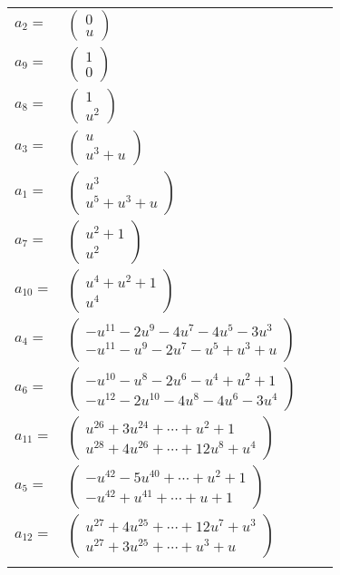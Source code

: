 \documentclass[1p]{elsarticle_modified}
\theoremstyle{definition}
\begin{document}
\begin{tabular}{m{7pt} m{180pt} m{7pt} m{180pt} }
\flushright $a_{2}=$&$\begin{pmatrix}0\\u\end{pmatrix}$ \\
\flushright $a_{9}=$&$\begin{pmatrix}1\\0\end{pmatrix}$ \\
\flushright $a_{8}=$&$\begin{pmatrix}1\\u^2\end{pmatrix}$ \\
\flushright $a_{3}=$&$\begin{pmatrix}u\\u^3+u\end{pmatrix}$ \\
\flushright $a_{1}=$&$\begin{pmatrix}u^3\\u^5+u^3+u\end{pmatrix}$ \\
\flushright $a_{7}=$&$\begin{pmatrix}u^2+1\\u^2\end{pmatrix}$ \\
\flushright $a_{10}=$&$\begin{pmatrix}u^4+u^2+1\\u^4\end{pmatrix}$ \\
\flushright $a_{4}=$&$\begin{pmatrix}- u^{11}-2 u^9-4 u^7-4 u^5-3 u^3\\- u^{11}- u^9-2 u^7- u^5+u^3+u\end{pmatrix}$ \\
\flushright $a_{6}=$&$\begin{pmatrix}- u^{10}- u^8-2 u^6- u^4+u^2+1\\- u^{12}-2 u^{10}-4 u^8-4 u^6-3 u^4\end{pmatrix}$ \\
\flushright $a_{11}=$&$\begin{pmatrix}u^{26}+3 u^{24}+\cdots+u^2+1\\u^{28}+4 u^{26}+\cdots+12 u^8+u^4\end{pmatrix}$ \\
\flushright $a_{5}=$&$\begin{pmatrix}- u^{42}-5 u^{40}+\cdots+u^2+1\\- u^{42}+u^{41}+\cdots+u+1\end{pmatrix}$ \\
\flushright $a_{12}=$&$\begin{pmatrix}u^{27}+4 u^{25}+\cdots+12 u^7+u^3\\u^{27}+3 u^{25}+\cdots+u^3+u\end{pmatrix}$\\&\end{tabular}
\end{document}

